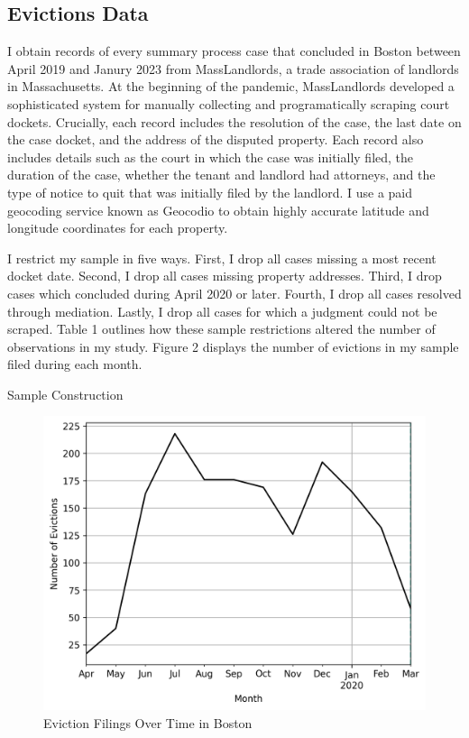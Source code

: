 \documentclass[12pt]{article}
\begin{document}
    \subsection{Evictions Data}
    I obtain records of every summary process case that concluded in Boston between April 2019 and Janury 2023 from MassLandlords, a trade association of landlords in Massachusetts. At the beginning of the pandemic, MassLandlords developed a sophisticated system for manually collecting and programatically scraping court dockets. Crucially, each record includes the resolution of the case, the last date on the case docket, and the address of the disputed property. Each record also includes details such as the court in which the case was initially filed, the duration of the case, whether the tenant and landlord had attorneys, and the type of notice to quit that was initially filed by the landlord. I use a paid geocoding service known as Geocodio to obtain highly accurate latitude and longitude coordinates for each property. 

    I restrict my sample in five ways. First, I drop all cases missing a most recent docket date. Second, I drop all cases missing property addresses. Third, I drop cases which concluded during April 2020 or later. Fourth, I drop all cases resolved through mediation. Lastly, I drop all cases for which a judgment could not be scraped. Table 1 outlines how these sample restrictions altered the number of observations in my study. Figure 2 displays the number of evictions in my sample filed during each month. 


\begin{table}[H]
    \centering
    
    \caption{Sample Construction}
    \label{tab:my_label}
\end{table}

        \begin{figure}[H]
            \centering
            \includegraphics{output/summary_statistics/figures/filings_over_time.png}
            \caption{Eviction Filings Over Time in Boston}
            \label{fig:my_label}
        \end{figure}
\end{document}
